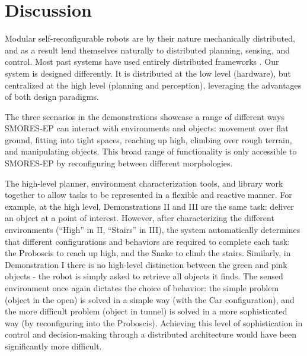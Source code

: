 \documentclass[12pt]{article}
\begin{document}
\section{Discussion}
\label{sec:discussion}
%
Modular self-reconfigurable robots are by their nature mechanically distributed, and as a result lend themselves naturally to distributed planning, sensing, and control. Most past systems have used entirely distributed frameworks \cite{Yim2007, Rubenstein2004,Murata2006,Dorigo2005,Mondada2005,o2010self}. Our system is designed differently.  It is distributed at the low level (hardware), but centralized at the high level (planning and perception), leveraging the advantages of both design paradigms.

The three scenarios in the demonstrations showcase a range of different ways SMORES-EP can interact with environments and objects: movement over flat ground, fitting into tight spaces, reaching up high, climbing over rough terrain, and manipulating objects.  This broad range of functionality is only accessible to SMORES-EP by reconfiguring between different morphologies.

The high-level planner, environment characterization tools, and library work together to allow tasks to be represented in a flexible and reactive manner. For example, at the high level, Demonstrations II and III are the same task: deliver an object at a point of interest.  However, after characterizing the different environments (``High'' in II, ``Stairs'' in III), the system automatically determines that different configurations and behaviors are required to complete each task:  the Proboscis to reach up high, and the Snake to climb the stairs.  
Similarly, in Demonstration I there is no high-level distinction between the green and pink objects - the robot is simply asked to retrieve all objects it finds.  The sensed environment once again dictates the choice of behavior: the simple problem (object in the open) is solved in a simple way (with the Car configuration), and the more difficult problem (object in tunnel) is solved in a more sophisticated way (by reconfiguring into the Proboscis).  Achieving this level of sophistication in control and decision-making through a distributed architecture would have been significantly more difficult.
\end{document}
